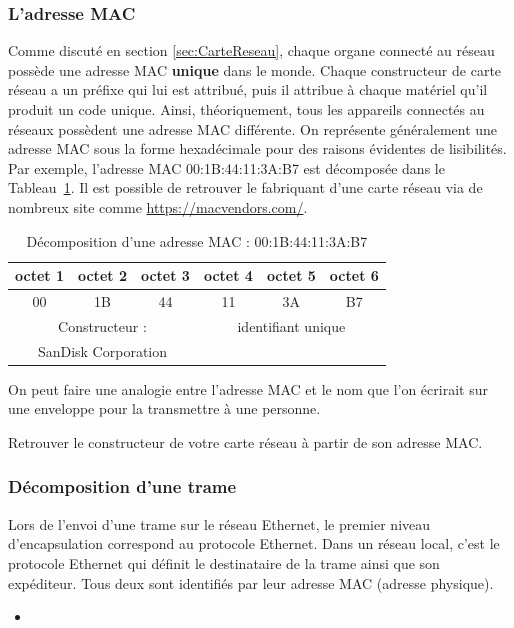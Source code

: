\subsubsection{L'adresse MAC}
Comme discuté en section \ref{sec:CarteReseau}, chaque organe connecté au réseau possède une adresse MAC \textbf{unique} dans le monde. Chaque constructeur de carte réseau a un préfixe qui lui est attribué, puis il attribue à chaque matériel qu'il produit un code unique. Ainsi, théoriquement, tous les appareils connectés au réseaux possèdent une adresse MAC différente. On représente généralement une adresse MAC sous la forme hexadécimale pour des raisons évidentes de lisibilités. Par exemple, l'adresse MAC 00:1B:44:11:3A:B7 est décomposée dans le Tableau~\ref{tab:macExample}. Il est possible de retrouver le fabriquant d'une carte réseau via de nombreux site comme \url{https://macvendors.com/}.

\begin{table}[h!t]
\centering
  \begin{tabular}{ccc|ccc}
    octet 1 & octet 2 & octet 3 & octet 4 & octet 5 & octet 6\\
    \hline
    00      & 1B    &     44    & 11      &3A       &B7\\\hline
    \multicolumn{3}{c|}{Constructeur : }&\multicolumn{3}{c}{identifiant unique}\\
    \multicolumn{3}{c|}{SanDisk Corporation}&\multicolumn{3}{c}{}

  \end{tabular}
  \caption{Décomposition d'une adresse MAC : 00:1B:44:11:3A:B7}
  \label{tab:macExample}
\end{table}

On peut faire une analogie entre l'adresse MAC et le nom que l'on écrirait sur une enveloppe pour la transmettre à une personne.

\begin{UPSTIactivite}
  Retrouver le constructeur de votre carte réseau à partir de son adresse MAC.
\end{UPSTIactivite}

\subsubsection{Décomposition d'une trame}

Lors de l'envoi d'une trame sur le réseau Ethernet, le premier niveau d'encapsulation correspond au protocole Ethernet. Dans un réseau local, c'est le protocole Ethernet qui définit le destinataire de la trame ainsi que son expéditeur. Tous deux sont identifiés par leur adresse MAC (adresse physique).
\begin{itemize}
  \item
\end{itemize}

